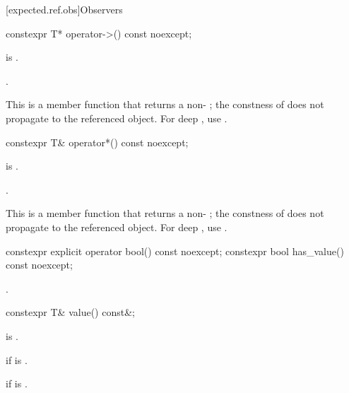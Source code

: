 [expected.ref.obs]{Observers}

%
\begin{itemdecl}
constexpr T* operator->() const noexcept;
\end{itemdecl}

\begin{itemdescr}
\pnum
\expects
{} is .

\pnum
\returns
{}.

\pnum
\remarks
This is a  member function that returns a non- ; the constness of  does not propagate to the referenced object. For deep , use .
\end{itemdescr}

%
\begin{itemdecl}
constexpr T& operator*() const noexcept;
\end{itemdecl}

\begin{itemdescr}
\pnum
\expects
{} is .

\pnum
\returns
{}.

\pnum
\remarks
This is a  member function that returns a non- ; the constness of  does not propagate to the referenced object. For deep , use .
\end{itemdescr}

%
%
\begin{itemdecl}
constexpr explicit operator bool() const noexcept;
constexpr bool has_value() const noexcept;
\end{itemdecl}

\begin{itemdescr}
\pnum
\returns
{}.
\end{itemdescr}

%
\begin{itemdecl}
constexpr T& value() const&;
\end{itemdecl}

\begin{itemdescr}
\pnum
\mandates
{} is .

\pnum
\returns
{} if  is .

\pnum
\throws
{} if  is .
\end{itemdescr}


